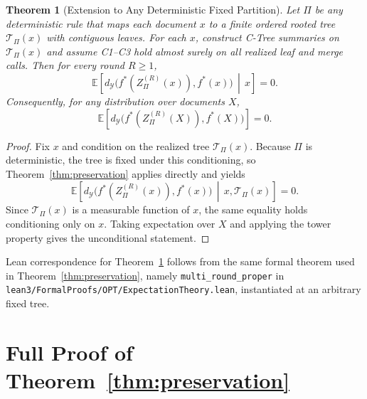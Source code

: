 \documentclass[11pt]{article}
\newtheorem{theorem}{Theorem}
\newcommand{\E}{\mathbb{E}}
\newcommand{\Y}{\mathcal{Y}}
\newcommand{\metric}{d_{\Y}}
\newcommand{\fstar}{f^\ast}
\begin{document}
\begin{theorem}[Extension to Any Deterministic Fixed Partition]\label{thm:fixed-partition}
Let $\Pi$ be any deterministic rule that maps each document $x$ to a finite ordered rooted tree $\mathcal{T}_\Pi(x)$ with contiguous leaves. For each $x$, construct C-Tree summaries on $\mathcal{T}_\Pi(x)$ and assume C1--C3 hold almost surely on all realized leaf and merge calls. Then for every round $R\ge 1$,
\[
\E\!\left[\metric\!\big(\fstar(Z_\Pi^{(R)}(x)),\fstar(x)\big)\,\middle|\,x\right]=0.
\]
Consequently, for any distribution over documents $X$,
\[
\E\!\left[\metric\!\big(\fstar(Z_\Pi^{(R)}(X)),\fstar(X)\big)\right]=0.
\]
\end{theorem}

\begin{proof}
Fix $x$ and condition on the realized tree $\mathcal{T}_\Pi(x)$. Because $\Pi$ is deterministic, the tree is fixed under this conditioning, so Theorem~\ref{thm:preservation} applies directly and yields
\[
\E\!\left[\metric\!\big(\fstar(Z_\Pi^{(R)}(x)),\fstar(x)\big)\,\middle|\,x,\mathcal{T}_\Pi(x)\right]=0.
\]
Since $\mathcal{T}_\Pi(x)$ is a measurable function of $x$, the same equality holds conditioning only on $x$. Taking expectation over $X$ and applying the tower property gives the unconditional statement.
\end{proof}

Lean correspondence for Theorem~\ref{thm:fixed-partition} follows from the same formal theorem used in Theorem~\ref{thm:preservation}, namely \texttt{multi\_round\_proper} in \texttt{lean3/FormalProofs/OPT/ExpectationTheory.lean}, instantiated at an arbitrary fixed tree.

\section{Full Proof of Theorem~\ref{thm:preservation}}\label{app:proof-preservation}
\end{document}
